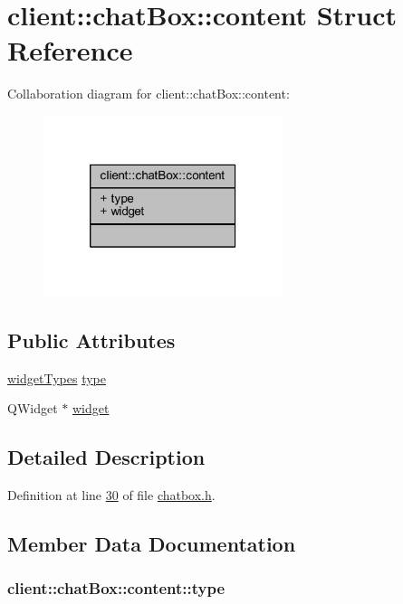 \hypertarget{structclient_1_1chat_box_1_1content}{\section{client\-:\-:chat\-Box\-:\-:content Struct Reference}
\label{d9/d25/structclient_1_1chat_box_1_1content}
}


Collaboration diagram for client\-:\-:chat\-Box\-:\-:content\-:\nopagebreak
\begin{figure}[H]
\begin{center}
\leavevmode
\includegraphics[width=198pt]{d1/daa/structclient_1_1chat_box_1_1content__coll__graph}
\end{center}
\end{figure}
\subsection*{Public Attributes}
\begin{DoxyCompactItemize}
\item 
\hyperlink{classclient_1_1chat_box_a48584884d56cec67ac35b8e8feeb21ad}{widget\-Types} \hyperlink{structclient_1_1chat_box_1_1content_a2de7a80ee6075db0545e0412846cef82}{type}
\item 
Q\-Widget $\ast$ \hyperlink{structclient_1_1chat_box_1_1content_a29b3c580e5b2c7ded4d0653d56a4f9de}{widget}
\end{DoxyCompactItemize}


\subsection{Detailed Description}


Definition at line \hyperlink{chatbox_8h_source_l00030}{30} of file \hyperlink{chatbox_8h_source}{chatbox.\-h}.



\subsection{Member Data Documentation}
\hypertarget{structclient_1_1chat_box_1_1content_a2de7a80ee6075db0545e0412846cef82}{
\subsubsection[{type}]{ client\-::chat\-Box\-::content\-::type}}\label{d9/d25/structclient_1_1chat_box_1_1content_a2de7a80ee6075db0545e0412846cef82}


